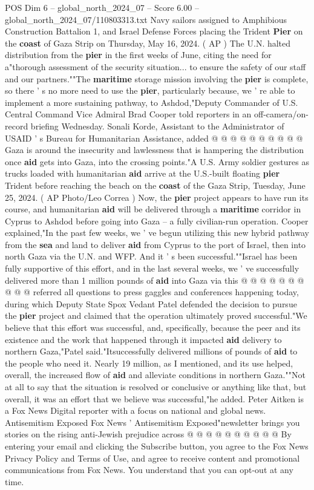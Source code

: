 \begin{textsample}{POS Dim 6 – global\_north\_2024\_07 – Score 6.00 – global\_north\_2024\_07/110803313.txt}
Navy sailors assigned to Amphibious Construction Battalion 1, and Israel Defense Forces placing the Trident \textbf{Pier} on the \textbf{coast} of Gaza Strip on Thursday, May 16, 2024. ( AP ) The U.N. halted distribution from the \textbf{pier} in the first weeks of June, citing the need for a"thorough assessment of the security situation... to ensure the safety of our staff and our partners.""The \textbf{maritime} storage mission involving the \textbf{pier} is complete, so there ' s no more need to use the \textbf{pier}, particularly because, we ' re able to implement a more sustaining pathway, to Ashdod,"Deputy Commander of U.S.
Central Command Vice Admiral Brad Cooper told reporters in an off-camera/on-record briefing Wednesday.
Sonali Korde, Assistant to the Administrator of USAID ' s Bureau for Humanitarian Assistance, added @ @ @ @ @ @ @ @ @ @ Gaza is around the insecurity and lawlessness that is hampering the distribution once \textbf{aid} gets into Gaza, into the crossing points."A U.S.
Army soldier gestures as trucks loaded with humanitarian \textbf{aid} arrive at the U.S.-built floating \textbf{pier} Trident before reaching the beach on the \textbf{coast} of the Gaza Strip, Tuesday, June 25, 2024. ( AP Photo/Leo Correa ) Now, the \textbf{pier} project appears to have run its course, and humanitarian \textbf{aid} will be delivered through a \textbf{maritime} corridor in Cyprus to Ashdod before going into Gaza -- a fully civilian-run operation.
Cooper explained,"In the past few weeks, we ' ve begun utilizing this new hybrid pathway from the \textbf{sea} and land to deliver \textbf{aid} from Cyprus to the port of Israel, then into north Gaza via the U.N. and WFP.
And it ' s been successful.""Israel has been fully supportive of this effort, and in the last several weeks, we ' ve successfully delivered more than 1 million pounds of \textbf{aid} into Gaza via this @ @ @ @ @ @ @ @ @ @ referred all questions to press gaggles and conferences happening today, during which Deputy State Spox Vedant Patel defended the decision to pursue the \textbf{pier} project and claimed that the operation ultimately proved successful."We believe that this effort was successful, and, specifically, because the peer and its existence and the work that happened through it impacted \textbf{aid} delivery to northern Gaza,"Patel said."Itsuccessfully delivered millions of pounds of \textbf{aid} to the people who need it.
Nearly 19 million, as I mentioned, and its use helped, overall, the increased flow of \textbf{aid} and alleviate conditions in northern Gaza.""Not at all to say that the situation is resolved or conclusive or anything like that, but overall, it was an effort that we believe was successful,"he added.
Peter Aitken is a Fox News Digital reporter with a focus on national and global news.
Antisemitism Exposed Fox News ' Antisemitism Exposed"newsletter brings you stories on the rising anti-Jewish prejudice across @ @ @ @ @ @ @ @ @ @ By entering your email and clicking the Subscribe button, you agree to the Fox News Privacy Policy and Terms of Use, and agree to receive content and promotional communications from Fox News.
You understand that you can opt-out at any time.


\end{textsample}
